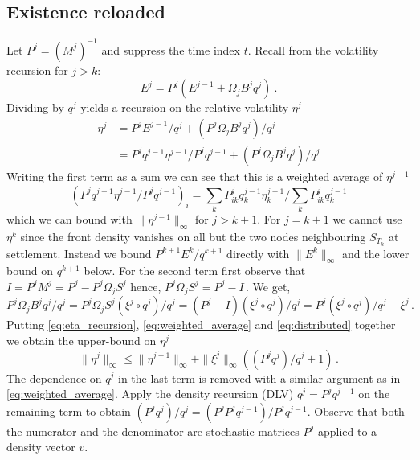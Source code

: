 \documentclass[11pt]{article}
\theoremstyle{plain}
\theoremstyle{definition}
\theoremstyle{remark}
\begin{document}
\subsection{Existence reloaded}
Let $P^j = (M^j)^{-1}$ and suppress the time index $t$. Recall from \cite{GROMM2026} the volatility recursion for $j > k$: 
\begin{equation}
  \label{eq:vol_recursion}
  E^{j} = P^j(E^{j-1} + \Omega_j B^j q^j) \ . 
\end{equation}
Dividing by $q^j$ yields a recursion on the relative volatility $\eta^j$ 
\begin{align}
  \eta^j & = P^j E^{j-1} / q^{j} + (P^j \Omega_j B^j q^j) / q^j  \\
  \label{eq:eta_recursion}
  & = P^j q^{j-1} \eta^{j-1} / P^j q^{j-1} + (P^j \Omega_j B^j q^j) / q^j 
\end{align}
Writing the first term as a sum we can see that this is a weighted average of $\eta^{j-1}$
\begin{equation} 
  \label{eq:weighted_average}
  (P^j q^{j-1} \eta^{j-1} / P^j q^{j-1})_{i} = \sum_{k} P^{j}_{ik} q^{j-1}_k \eta^{j-1}_k / \sum_{k} P^{j}_{ik} q^{j-1}_k 
\end{equation}
which we can bound with $\|\eta^{j-1}\|_\infty$ for $j > k+1$. For $j = k+1$ we cannot use $\eta^k$ since the front density vanishes on all but the two nodes neighbouring $S_{T_k}$ at settlement. Instead we bound $P^{k+1} E^k / q^{k+1}$ directly with $\|E^k\|_\infty$ and the lower bound on $q^{k+1}$ below.
For the second term first observe that $I = P^j M^j = P^j - P^j \Omega_j S^j $ hence, 
$P^j \Omega_j S^j = P^j - I \, . $ We get,
\begin{equation}
  \label{eq:distributed}
  P^j \Omega_j B^j q^j / q^j = P^j \Omega_j S^j (\xi^j \circ q^j) / q^j =   (P^j - I) (\xi^j \circ q^j) / q^j = P^j (\xi^j \circ q^j) / q^j - \xi^j \, .
\end{equation}
Putting \eqref{eq:eta_recursion}, \eqref{eq:weighted_average} and \eqref{eq:distributed} together we obtain the upper-bound on $\eta^j$
\begin{equation}\|\eta^j\|_\infty \leq \|\eta^{j-1}\|_\infty + \| \xi^j\|_\infty \left((P^j q^j) / q^j +  1 \right) \,. \end{equation}
The dependence on $q^j$ in the last term is removed with a similar argument as in \eqref{eq:weighted_average}. Apply the density recursion (DLV) $q^{j} = P^j q^{j-1}$ on the remaining term to obtain $(P^j q^j) / q^j = (P^j P^j q^{j-1}) / P^j q^{j-1}$. Observe that both the numerator and the denominator are stochastic matrices $P^j$ applied to a density vector $v$.
\end{document}
